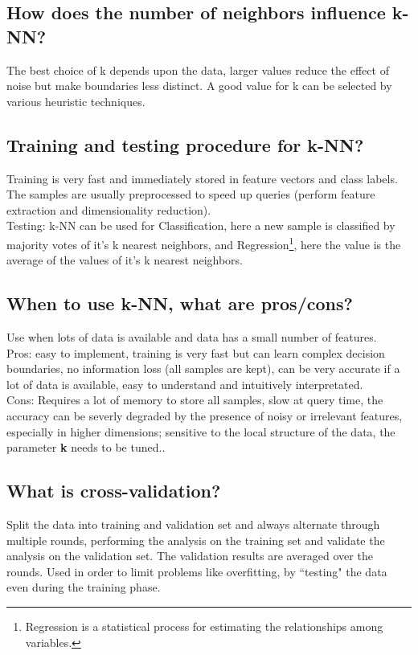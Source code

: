 \documentclass[12pt]{scrartcl}
\begin{document}
\subsection{How does the number of neighbors influence k-NN?}
The best choice of k depends upon the data, larger values reduce the effect of noise but make boundaries less distinct. A good value for k can be selected by various heuristic techniques.

\subsection{Training and testing procedure for k-NN?}
Training is very fast and immediately stored in feature vectors and class labels. The samples are usually preprocessed to speed up queries (perform feature extraction and dimensionality reduction). \\
Testing: k-NN can be used for Classification, here a new sample is classified by majority votes of it's k nearest neighbors, and Regression\footnote{Regression is a statistical process for estimating the relationships among variables.}, here the value is the average of the values of it's k nearest neighbors.

\subsection{When to use k-NN, what are pros/cons?}
Use when lots of data is available and data has a small number of features. \\
Pros: easy to implement, training is very fast but can learn complex decision boundaries, no information loss (all samples are kept), can be very accurate if a lot of data is available, easy to understand and intuitively interpretated. \\
Cons: Requires a lot of memory to store all samples, slow at query time, the accuracy can be severly degraded by the presence of noisy or irrelevant features, especially in higher dimensions; sensitive to the local structure of the data, the parameter {\bf k} needs to be tuned..

\subsection{What is cross-validation?}
Split the data into training and validation set and always alternate through multiple rounds, performing the analysis on the training set and validate the analysis on the validation set. The validation results are averaged over the rounds. Used in order to limit problems like overfitting, by ``testing" the data even during the training phase.
\end{document}
